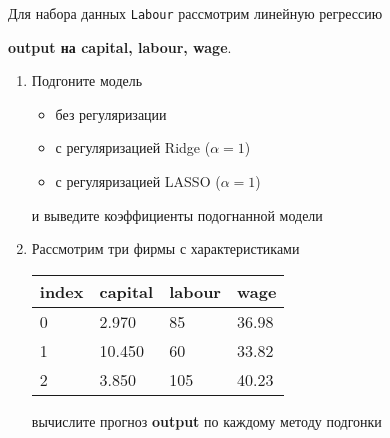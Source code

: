 \begin{exercise}
Для набора данных \texttt{Labour} рассмотрим линейную регрессию 
\begin{center}
	\textbf{output на capital, labour, wage}.
\end{center}
\begin{enumerate}
	\item Подгоните модель
	\begin{itemize}
		\item без регуляризации
		\item с регуляризацией Ridge (\(\alpha=1\))
		\item с регуляризацией LASSO (\(\alpha=1\))
	\end{itemize}
	и выведите коэффициенты подогнанной модели
	\item Рассмотрим три фирмы с характеристиками
	\begin{center}
		\begin{tabular}{|l||l|l|l|}\hline
			index & capital & labour & wage \\ \hline\hline
			0 & 2.970 & 85 & 36.98\\
			1 & 10.450 & 60 & 33.82  \\
			2 & 3.850 & 105 & 40.23\\ \hline
		\end{tabular}
	\end{center}
	вычислите прогноз \textbf{output} по каждому методу подгонки
\end{enumerate}
\end{exercise}

